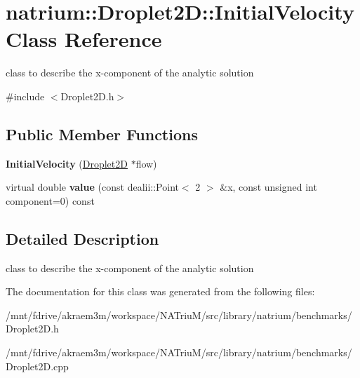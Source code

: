 \hypertarget{classnatrium_1_1Droplet2D_1_1InitialVelocity}{
\section{natrium::Droplet2D::InitialVelocity Class Reference}
\label{classnatrium_1_1Droplet2D_1_1InitialVelocity}
}


class to describe the x-\/component of the analytic solution  


{\ttfamily \#include $<$Droplet2D.h$>$}\subsection*{Public Member Functions}
\begin{DoxyCompactItemize}
\item 
\hypertarget{classnatrium_1_1Droplet2D_1_1InitialVelocity_a66aa9656b11d7e713b896c077eeef8f4}{
{\bfseries InitialVelocity} (\hyperlink{classnatrium_1_1Droplet2D}{Droplet2D} $\ast$flow)}
\label{classnatrium_1_1Droplet2D_1_1InitialVelocity_a66aa9656b11d7e713b896c077eeef8f4}

\item 
\hypertarget{classnatrium_1_1Droplet2D_1_1InitialVelocity_a3fdba55d8a732da474bc0c224784f838}{
virtual double {\bfseries value} (const dealii::Point$<$ 2 $>$ \&x, const unsigned int component=0) const }
\label{classnatrium_1_1Droplet2D_1_1InitialVelocity_a3fdba55d8a732da474bc0c224784f838}

\end{DoxyCompactItemize}


\subsection{Detailed Description}
class to describe the x-\/component of the analytic solution 

The documentation for this class was generated from the following files:\begin{DoxyCompactItemize}
\item 
/mnt/fdrive/akraem3m/workspace/NATriuM/src/library/natrium/benchmarks/Droplet2D.h\item 
/mnt/fdrive/akraem3m/workspace/NATriuM/src/library/natrium/benchmarks/Droplet2D.cpp\end{DoxyCompactItemize}
